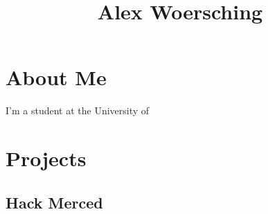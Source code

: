 \documentclass[letterpaper, 12pt]{article}
\title{Alex Woersching}
\begin{document}
\maketitle
\section{About Me}
\par I'm a student at the University of \blindtext
\section{Projects}
\subsection{Hack Merced}
\blindtext
\end{document}
